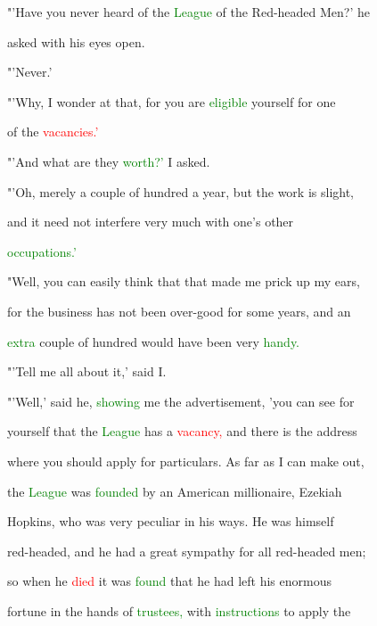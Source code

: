  "'Have you never heard of the \textcolor{green}{League} of the Red-headed Men?' he

 asked with his eyes open.



 "'Never.'



 "'Why, I wonder at that, for you are \textcolor{green}{eligible} yourself for one

 of the \textcolor{red}{vacancies.'}



 "'And what are they \textcolor{green}{worth?'} I asked.



 "'Oh, merely a couple of hundred a year, but the work is slight,

 and it need not interfere very much with one's other

 \textcolor{green}{occupations.'}



 "Well, you can easily think that that made me \textcolor{BurntOrange}{prick} up my ears,

 for the business has not been over-good for some years, and an

 \textcolor{green}{extra} couple of hundred would have been very \textcolor{green}{handy.}



 "'Tell me all about it,' said I.



 "'Well,' said he, \textcolor{green}{showing} me the advertisement, 'you can see for

 yourself that the \textcolor{green}{League} has a \textcolor{red}{vacancy,} and there is the address

 where you should apply for particulars. As far as I can make out,

 the \textcolor{green}{League} was \textcolor{green}{founded} by an American millionaire, Ezekiah

 Hopkins, who was very peculiar in his ways. He was himself

 red-headed, and he had a great \textcolor{BurntOrange}{sympathy} for all red-headed men;

 so when he \textcolor{red}{died} it was \textcolor{green}{found} that he had left his enormous

 \textcolor{BurntOrange}{fortune} in the hands of \textcolor{green}{trustees,} with \textcolor{green}{instructions} to apply the

